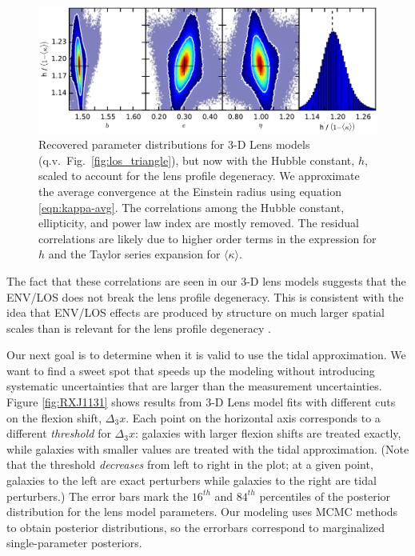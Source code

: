 \documentclass{emulateapj}
\begin{document}
\begin{figure}[ht]
\begin{center}
\includegraphics[width=1\textwidth]{los_scaled_h.pdf}
\caption{\label{fig:scaled_triangle} Recovered parameter distributions for 3-D Lens models (q.v.\ Fig.\ \ref{fig:los_triangle}), but now with the Hubble constant, $h$, scaled to account for the lens profile degeneracy.  We approximate the average convergence at the Einstein radius using equation \ref{eqn:kappa-avg}. The correlations among the Hubble constant, ellipticity, and power law index are mostly removed. The residual correlations are likely due to higher order terms in the expression for $h$ \citep{Kochanek02} and the Taylor series expansion for $\langle \kappa \rangle$.%
}
\end{center}
\end{figure}

The fact that these correlations are seen in our 3-D lens models suggests that the ENV/LOS does not break the lens profile degeneracy. This is consistent with the idea that ENV/LOS effects are produced by structure on much larger spatial scales than is relevant for the lens profile degeneracy \citep{Xu15,Schneider13}.

Our next goal is to determine when it is valid to use the tidal approximation.  We want to find a sweet spot that speeds up the modeling without introducing systematic uncertainties that are larger than the measurement uncertainties.  Figure \ref{fig:RXJ1131} shows results from 3-D Lens model fits with different cuts on the flexion shift, $\Delta_3 x$.  Each point on the horizontal axis corresponds to a different \emph{threshold} for $\Delta_3 x$: galaxies with larger flexion shifts are treated exactly, while galaxies with smaller values are treated with the tidal approximation.  (Note that the threshold \emph{decreases} from left to right in the plot; at a given point, galaxies to the left are exact perturbers while galaxies to the right are tidal perturbers.)  The error bars mark the $16^{th}$ and $84^{th}$ percentiles of the posterior distribution for the lens model parameters.  Our modeling uses MCMC methods to obtain posterior distributions, so the errorbars correspond to marginalized single-parameter posteriors.
\end{document}
